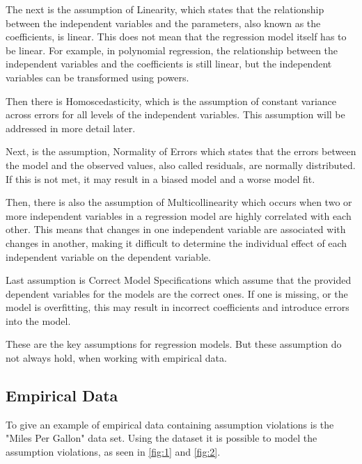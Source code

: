 \noindent The next is the assumption of Linearity, which states that the relationship between the independent variables and the parameters, also known as the coefficients, is linear. This does not mean that the regression model itself has to be linear. For example, in polynomial regression, the relationship between the independent variables and the coefficients is still linear, but the independent variables can be transformed using powers.\newline


\noindent Then there is Homoscedasticity, which is the assumption of constant variance across errors for all levels of the independent variables. This assumption will be addressed in more detail later. \newline

\noindent Next, is the assumption, Normality of Errors which states that the errors between the model and the observed values, also called residuals, are normally distributed. If this is not met, it may result in a biased model and a worse model fit. \newline


\noindent Then, there is also the assumption of Multicollinearity which occurs when two or more independent variables in a regression model are highly correlated with each other. This means that changes in one independent variable are associated with changes in another, making it difficult to determine the individual effect of each independent variable on the dependent variable. \newline

\noindent Last assumption is Correct Model Specifications which assume that the provided dependent variables for the models are the correct ones. If one is missing, or the model is overfitting, this may result in incorrect coefficients and introduce errors into the model. \newline

\noindent These are the key assumptions for regression models. But these assumption do not always hold, when working with empirical data. 

 

\subsection{Empirical Data}
To give an example of empirical data containing assumption violations is the "Miles Per Gallon" data set. Using the dataset it is possible to model the assumption violations, as seen in \autoref{fig:1} and \autoref{fig:2}.
\newline

